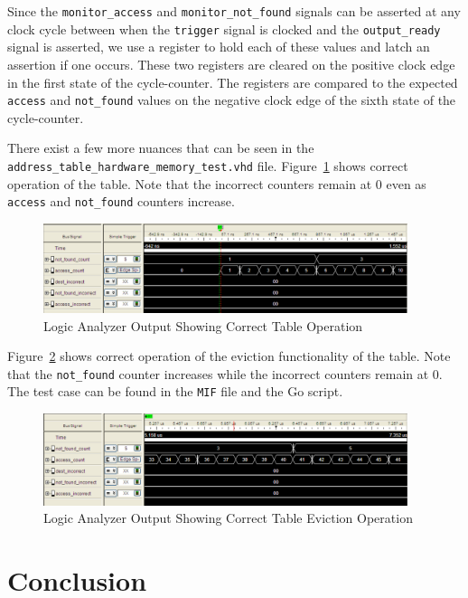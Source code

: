 \documentclass{article}
\begin{document}
Since the \texttt{monitor\_access} and \texttt{monitor\_not\_found} signals can be asserted at any clock cycle between when the \texttt{trigger} signal is clocked and the \texttt{output\_ready} signal is asserted, we use a register to hold each of these values and latch an assertion if one occurs. These two registers are cleared on the positive clock edge in the first state of the cycle-counter. The registers are compared to the expected \texttt{access} and \texttt{not\_found} values on the negative clock edge of the sixth state of the cycle-counter.

There exist a few more nuances that can be seen in the \texttt{address\_table\_hardware\_memory\_test.vhd} file. Figure~\ref{fig:hardware_1} shows correct operation of the table. Note that the incorrect counters remain at 0 even as \texttt{access} and \texttt{not\_found} counters increase.

\begin{figure}[ht!]
  \centering
  	\includegraphics[width=0.95\textwidth]{hardware_1.PNG}
  \caption{Logic Analyzer Output Showing Correct Table Operation}
  \label{fig:hardware_1}
\end{figure}

Figure~\ref{fig:hardware_2} shows correct operation of the eviction functionality of the table. Note that the \texttt{not\_found} counter increases while the incorrect counters remain at 0. The test case can be found in the \texttt{MIF} file and the Go script.

\begin{figure}[ht!]
  \centering
  	\includegraphics[width=0.95\textwidth]{hardware_2.PNG}
  \caption{Logic Analyzer Output Showing Correct Table Eviction Operation}
  \label{fig:hardware_2}
\end{figure}

\section{Conclusion}
\end{document}
